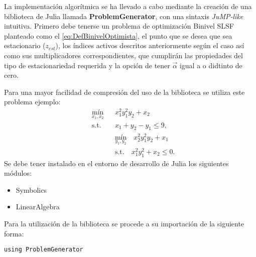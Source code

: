 La implementación algorítmica se ha llevado a cabo mediante la creación de una biblioteca de Julia
llamada \textbf{ProblemGenerator}, con una sintaxis \textit{JuMP-like} intuitiva.
Primero debe tenerse un problema de optimización Binivel SLSF planteado como el \ref{eq:DefBinivelOptimista}, el punto que se desea que sea estacionario ($z_{est}$), los índices activos descritos anteriormente 
según el caso así como sus multiplicadores correspondientes, que cumplirán las propiedades del tipo de estacionariedad requerida y la opci\'on de tener  $\vec{\alpha}$ igual a o didtinto de cero.

Para una mayor facilidad de compresión del uso de la biblioteca se utiliza este problema ejemplo:
\begin{equation}
    \begin{aligned}
        & \underset{x_1, x_2}{\text{mín}} 
        && x_1^2 y_1^2 y_2 + x_2 \\
        & \text{s.t.} 
        && x_1 + y_2 - y_1 \leq 9, \\
        & 
        && \underset{y_1, y_2}{\text{mín}} 
        \quad x_2^2 y_1^2 y_2 + x_1 \\
        & 
        && \text{s.t.} 
        \quad x_1^2 y_1^2 + x_2 \leq 0.
    \end{aligned}
    \label{ProblemaEjemplo}
\end{equation}
Se debe tener instalado en el entorno de desarrollo de Julia los siguientes módulos:
\begin{itemize}
    \item Symbolics 
    \item LinearAlgebra
\end{itemize}

Para la utilización de la biblioteca se procede a su importación de la siguiente forma:
\begin{lstlisting}[caption=Importar el Módulo]
    using ProblemGenerator
\end{lstlisting}

